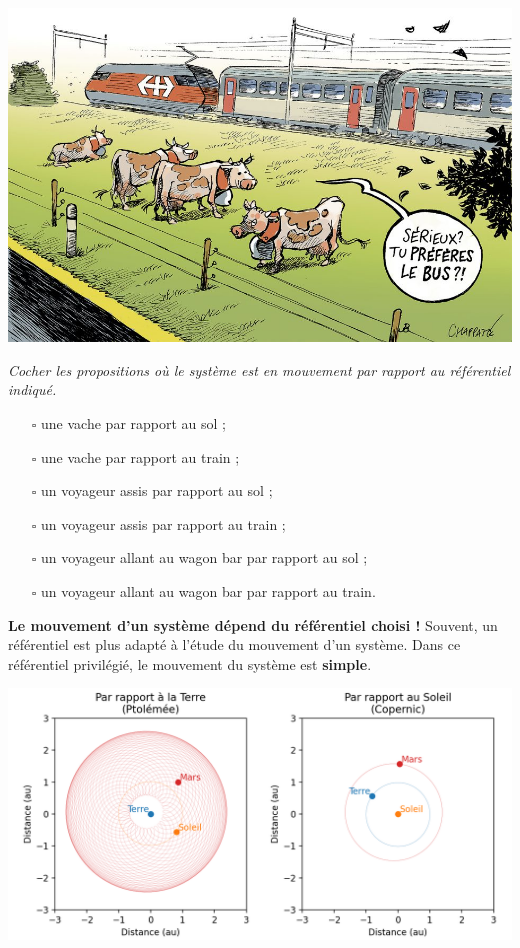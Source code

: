 \documentclass[12pt,a4paper]{article}
\begin{document}
\begin{multicols}{2}
\begin{center}
\includegraphics[trim = 60pt 0pt 10pt 0pt, clip, width=\linewidth]{images/train_cow.jpg}
\end{center}

\begin{em}
\textit{Cocher les propositions où le système est en mouvement par rapport au référentiel indiqué.}
\begin{itemize}
\item[$\square$] une vache par rapport au sol ;
\item[$\square$] une vache par rapport au train ;
\item[$\square$] un voyageur assis par rapport au sol ;
\item[$\square$] un voyageur assis par rapport au train ;
\item[$\square$] un voyageur allant au wagon bar par rapport au sol ;
\item[$\square$] un voyageur allant au wagon bar par rapport au train.
\end{itemize}
\end{em}
\end{multicols}

\textbf{Le mouvement d'un système dépend du référentiel choisi !}
Souvent, un référentiel est plus adapté à l'étude du mouvement d'un système.
Dans ce référentiel privilégié, le mouvement du système est \textbf{simple}.

\begin{center}
\includegraphics[scale=0.75]{images/retrograde_motion.png}
\end{center}
\end{document}
